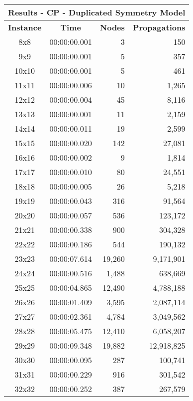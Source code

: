 
\begin{center}
    \begin{tabular}{|c|c|r|r|}
        \hline
        \multicolumn{4}{|c|}{\textbf{Results - CP - Duplicated Symmetry Model}} \\
        \hline
        \textbf{Instance} & \textbf{Time} & \textbf{Nodes} & \textbf{Propagations} \\
        
        \hline
		8x8 & 00:00:00.001 & 3 & 150 \\ \hline
		9x9 & 00:00:00.001 & 5 & 357 \\ \hline
		10x10 & 00:00:00.001 & 5 & 461 \\ \hline
		11x11 & 00:00:00.006 & 10 & 1,265 \\ \hline
		12x12 & 00:00:00.004 & 45 & 8,116 \\ \hline
		13x13 & 00:00:00.001 & 11 & 2,159 \\ \hline
		14x14 & 00:00:00.011 & 19 & 2,599 \\ \hline
		15x15 & 00:00:00.020 & 142 & 27,081 \\ \hline
		16x16 & 00:00:00.002 & 9 & 1,814 \\ \hline
		17x17 & 00:00:00.010 & 80 & 24,551 \\ \hline
		18x18 & 00:00:00.005 & 26 & 5,218 \\ \hline
		19x19 & 00:00:00.043 & 316 & 91,564 \\ \hline
		20x20 & 00:00:00.057 & 536 & 123,172 \\ \hline
		21x21 & 00:00:00.338 & 900 & 304,328 \\ \hline
		22x22 & 00:00:00.186 & 544 & 190,132 \\ \hline
		23x23 & 00:00:07.614 & 19,260 & 9,171,901 \\ \hline
		24x24 & 00:00:00.516 & 1,488 & 638,669 \\ \hline
		25x25 & 00:00:04.865 & 12,490 & 4,788,188 \\ \hline
		26x26 & 00:00:01.409 & 3,595 & 2,087,114 \\ \hline
		27x27 & 00:00:02.361 & 4,784 & 3,049,562 \\ \hline
		28x28 & 00:00:05.475 & 12,410 & 6,058,207 \\ \hline
		29x29 & 00:00:09.348 & 19,882 & 12,918,825 \\ \hline
		30x30 & 00:00:00.095 & 287 & 100,741 \\ \hline
		31x31 & 00:00:00.229 & 916 & 301,542 \\ \hline
		32x32 & 00:00:00.252 & 387 & 267,579 \\ \hline

\end{tabular}
\end{center}
